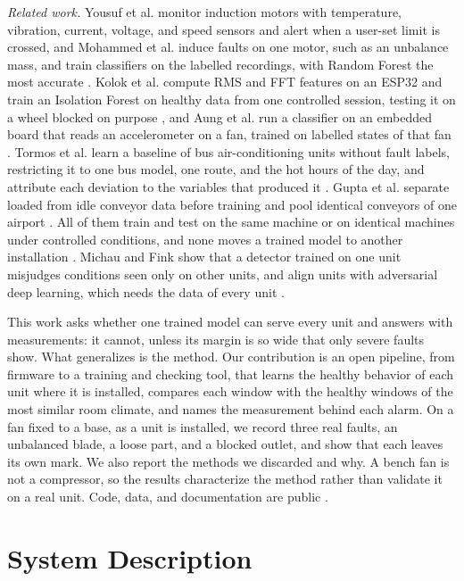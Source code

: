 \documentclass[english,hidelinks]{sbrt}
\begin{document}
\textit{Related work.} Yousuf et al. monitor induction motors with temperature, vibration, current, voltage, and speed sensors and alert when a user-set limit is crossed, and Mohammed et al. induce faults on one motor, such as an unbalance mass, and train classifiers on the labelled recordings, with Random Forest the most accurate \cite{yousuf2024iot,mohammed2023iot}. Kolok et al. compute RMS and FFT features on an ESP32 and train an Isolation Forest on healthy data from one controlled session, testing it on a wheel blocked on purpose \cite{kolok2025lowcost}, and Aung et al. run a classifier on an embedded board that reads an accelerometer on a fan, trained on labelled states of that fan \cite{aung2024fan}. Tormos et al. learn a baseline of bus air-conditioning units without fault labels, restricting it to one bus model, one route, and the hot hours of the day, and attribute each deviation to the variables that produced it \cite{tormos2026hvacxai}. Gupta et al. separate loaded from idle conveyor data before training and pool identical conveyors of one airport \cite{gupta2023baggage}. All of them train and test on the same machine or on identical machines under controlled conditions, and none moves a trained model to another installation \cite{meitz2025pdmframework}. Michau and Fink show that a detector trained on one unit misjudges conditions seen only on other units, and align units with adversarial deep learning, which needs the data of every unit \cite{michau2021transfer}.

This work asks whether one trained model can serve every unit and answers with measurements: it cannot, unless its margin is so wide that only severe faults show. What generalizes is the method. Our contribution is an open pipeline, from firmware to a training and checking tool, that learns the healthy behavior of each unit where it is installed, compares each window with the healthy windows of the most similar room climate, and names the measurement behind each alarm. On a fan fixed to a base, as a unit is installed, we record three real faults, an unbalanced blade, a loose part, and a blocked outlet, and show that each leaves its own mark. We also report the methods we discarded and why. A bench fan is not a compressor, so the results characterize the method rather than validate it on a real unit. Code, data, and documentation are public \cite{repo}.

\section{System Description}
\label{sec:system-description}
\end{document}
